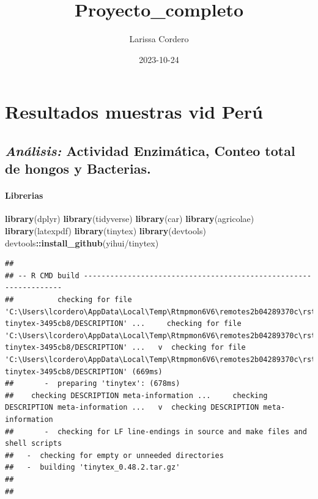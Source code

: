 \documentclass[
]{article}
\title{Proyecto\_completo}
\author{Larissa Cordero}
\date{2023-10-24}
\newenvironment{Shaded}{\begin{snugshade}}{\end{snugshade}}
\newcommand{\FunctionTok}[1]{\textcolor[rgb]{0.13,0.29,0.53}{\textbf{#1}}}
\newcommand{\NormalTok}[1]{#1}
\newcommand{\SpecialCharTok}[1]{\textcolor[rgb]{0.81,0.36,0.00}{\textbf{#1}}}
\newcommand{\StringTok}[1]{\textcolor[rgb]{0.31,0.60,0.02}{#1}}
\begin{document}
\maketitle

\hypertarget{resultados-muestras-vid-peruxfa}{%
\section{Resultados muestras vid
Perú}\label{resultados-muestras-vid-peruxfa}}

\hypertarget{anuxe1lisis-actividad-enzimuxe1tica-conteo-total-de-hongos-y-bacterias.}{%
\subsection{\texorpdfstring{\emph{Análisis:} Actividad Enzimática,
Conteo total de hongos y
Bacterias.}{Análisis: Actividad Enzimática, Conteo total de hongos y Bacterias.}}\label{anuxe1lisis-actividad-enzimuxe1tica-conteo-total-de-hongos-y-bacterias.}}

\hypertarget{librerias}{%
\paragraph{Librerias}\label{librerias}}

\begin{Shaded}
\begin{Highlighting}[]
\FunctionTok{library}\NormalTok{(dplyr)}
\FunctionTok{library}\NormalTok{(tidyverse)}
\FunctionTok{library}\NormalTok{(car)}
\FunctionTok{library}\NormalTok{(agricolae)}
\FunctionTok{library}\NormalTok{(latexpdf)}
\FunctionTok{library}\NormalTok{(tinytex)}
\FunctionTok{library}\NormalTok{(devtools)}
\NormalTok{devtools}\SpecialCharTok{::}\FunctionTok{install\_github}\NormalTok{(}\StringTok{\textquotesingle{}yihui/tinytex\textquotesingle{}}\NormalTok{)}
\end{Highlighting}
\end{Shaded}

\begin{verbatim}
## 
## -- R CMD build -----------------------------------------------------------------
##          checking for file 'C:\Users\lcordero\AppData\Local\Temp\Rtmpmon6V6\remotes2b04289370c\rstudio-tinytex-3495cb8/DESCRIPTION' ...     checking for file 'C:\Users\lcordero\AppData\Local\Temp\Rtmpmon6V6\remotes2b04289370c\rstudio-tinytex-3495cb8/DESCRIPTION' ...   v  checking for file 'C:\Users\lcordero\AppData\Local\Temp\Rtmpmon6V6\remotes2b04289370c\rstudio-tinytex-3495cb8/DESCRIPTION' (669ms)
##       -  preparing 'tinytex': (678ms)
##    checking DESCRIPTION meta-information ...     checking DESCRIPTION meta-information ...   v  checking DESCRIPTION meta-information
##       -  checking for LF line-endings in source and make files and shell scripts
##   -  checking for empty or unneeded directories
##   -  building 'tinytex_0.48.2.tar.gz'
##      
## 
\end{verbatim}
\end{document}
